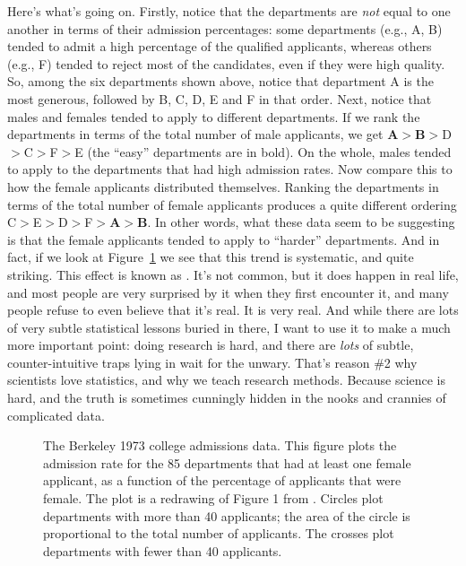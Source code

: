 Here's what's going on. Firstly, notice that the departments are {\it not} equal to one another in terms of their admission percentages: some departments (e.g., A, B) tended to admit a high percentage of the qualified applicants, whereas others (e.g., F) tended to reject most of the candidates, even if they were high quality. So, among the six departments shown above, notice that department A is the most generous, followed by B, C, D, E and F in that order. Next, notice that males and females tended to apply to different departments. If we rank the departments in terms of the total number of male applicants, we get {\bf A}$>${\bf B}$>$D$>$C$>$F$>$E (the ``easy'' departments are in bold). On the whole, males tended to apply to the departments that had high admission rates. Now compare this to how the female applicants distributed themselves. Ranking the departments in terms of the total number of female applicants produces a quite different ordering C$>$E$>$D$>$F$>${\bf A}$>${\bf B}. In other words, what these data seem to be suggesting is that the female applicants tended to apply to ``harder'' departments. And in fact, if we look at Figure~\ref{fig:berkeley} we see that this trend is systematic, and quite striking. This effect is known as . It's not common, but it does happen in real life, and most people are very surprised by it when they first encounter it, and many people refuse to even believe that it's real. It is very real. And while there are lots of very subtle statistical lessons buried in there, I want to use it to make a much more important point: doing research is hard, and there are {\it lots} of subtle, counter-intuitive traps lying in wait for the unwary.  That's reason \#2 why scientists love statistics, and why we teach research methods. Because science is hard, and the truth is sometimes cunningly hidden in the nooks and crannies of complicated data.

\begin{figure}[t!]
\begin{center}
\caption[The Berkeley 1973 college admissions data.]{The Berkeley 1973 college admissions data. This figure plots the admission rate for the 85 departments that had at least one female applicant, as a function of the percentage of applicants that were female. The plot is a redrawing of Figure 1 from \textcite{Bickel1975}. Circles plot departments with more than 40 applicants; the area of the circle is proportional to the total number of applicants. The crosses plot departments with fewer than 40 applicants. } 
\label{fig:berkeley}
\end{center}
\end{figure}

